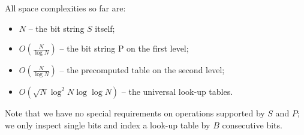 \bigskip

All space complexities so far are:
\begin{itemize}
	\item $N$ -- the bit string $S$ itself;
	\item $O(\frac{N}{\log N})$ -- the bit string P on the first level;
	\item $O(\frac{N}{\log N})$ -- the precomputed table on the second level;
	\item $O(\sqrt{N}\log^2 N \log\log N)$ -- the universal look-up tables.
\end{itemize}
Note that we have no special requirements on operations supported by $S$ and $P$; we only inspect single bits and index a look-up table by $B$ consecutive bits.




